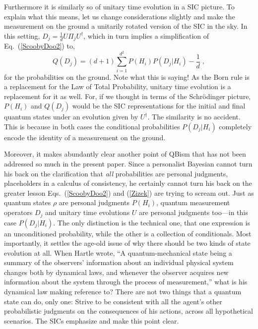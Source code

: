 \documentclass[aps,pra,superscriptaddress,12pt,tightenlines,nofootinbib]{revtex4-2}
\begin{document}
Furthermore it is similarly so of unitary time evolution in a SIC picture.  To explain what this means, let us change considerations slightly and make the measurement on the ground a unitarily rotated version of the SIC in the sky.  In this setting, $D_j=\frac{1}{d}U\Pi_j U^\dagger$, which in turn implies a simplification of Eq.~(\ref{ScoobyDoo2}) to,
\begin{equation}
Q(D_j) = (d+1)\sum_{i=1}^{d^2} P(H_i) P(D_j|H_i) - \frac{1}{d}\;,
\label{Zizek}
\end{equation}
for the probabilities on the ground.  Note what this is saying!  As the Born rule is a replacement for the Law of Total Probability, unitary time evolution is a replacement for it as well.  For, if we thought in terms of the Schr\"odinger picture, $P(H_i)$ and $Q(D_j)$ would be the SIC representations for the initial and final quantum states under an evolution given by $U^\dagger$. The similarity is no accident.  This is because in both cases the conditional probabilities $P(D_j|H_i)$ completely encode the identity of a measurement on the ground.

Moreover, it makes abundantly clear another point of QBism that has not been addressed so much in the present paper.  Since a personalist Bayesian cannot turn his back on the clarification that {\it all\/} probabilities are personal judgments, placeholders in a calculus of consistency, he certainly cannot turn his back on the greater lesson Eqs.~(\ref{ScoobyDoo2}) and (\ref{Zizek}) are trying to scream out.   Just as quantum states $\rho$ are personal judgments $P(H_i)$, quantum measurement operators $D_j$ and unitary time evolutions $U$ are personal judgments too---in this case $P(D_j|H_i)$.  The only distinction is the technical one, that one expression is an unconditioned probability, while the other is a collection of conditionals.  Most importantly, it settles the age-old issue of why there should be two kinds of state evolution at all.  When Hartle wrote, ``A quantum-mechanical state being a summary of the observers' information about an individual physical system changes both by dynamical laws, and whenever the observer acquires new information about the system through the process of measurement,'' what is his dynamical law making reference to?  There are not two things that a quantum state can do, only one:  Strive to be consistent with all the agent's other probabilistic judgments on the consequences of his actions, across all hypothetical scenarios.  The SICs emphasize and make this point clear.
\end{document}
